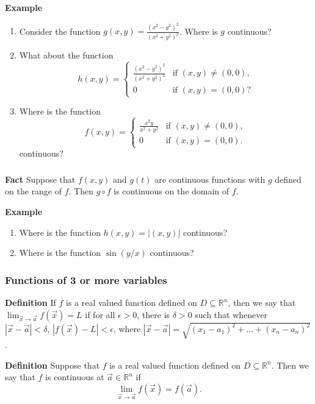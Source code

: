 \begin{frame}[fragile]\frametitle{}
 
\textbf{Example}
\begin{enumerate}
\item  Consider the function $g(x,y) = \frac{ (x^2-y^2)^2 }{(x^2+y^2)^2}$.  Where is $g$ continuous?  
\item  What about the function 
                $$h(x,y)=\begin{cases}
                                     \frac{ (x^2-y^2)^2 }{(x^2+y^2)^2} & \mbox{if $(x,y)\neq (0,0)$}, \\
                                      0  & \mbox{if $(x,y)=(0,0)$}?
                                \end{cases}
                 $$
\item  Where is the function 
                  $$f(x,y)=\begin{cases}
                                      \frac{x^2y}{x^2+y^2} & \mbox{if $(x,y)\neq (0,0)$}, \\
                                      0  & \mbox{if $(x,y)=(0,0)$}.
                                \end{cases}
                 $$
           continuous?
\end{enumerate}

\end{frame}


\begin{frame}[fragile]\frametitle{}
 
\textbf{Fact}
Suppose that $f(x,y)$ and $g(t)$ are continuous functions with $g$ defined on the range of $f$.  Then $g\circ f$ is continuous on the domain of $f$.
  

\textbf{Example}
\begin{enumerate}
\item  Where is the function $h(x,y)=|(x,y)|$ continuous?  
\item  Where is the function $\sin(y/x)$ continuous?
\end{enumerate}

\end{frame}

\begin{frame}[fragile] \frametitle{Functions of 3 or more variables}
\textbf{Definition}
If $f$ is a real valued function defined on $D\subseteq \mathbb R^n$, then we say that $\lim_{\vec{x}\rightarrow\vec{a}} f(\vec{x})=L$ if
for all $\epsilon >0$, there is $\delta > 0$ such that whenever $|\vec{x}-\vec{a}|<\delta$, $|f(\vec{x})-L|<\epsilon$, where 
$|\vec{x}-\vec{a}| =\sqrt{(x_1-a_1)^2 +\dots +(x_n-a_n)^2}$.
  

\textbf{Definition}
Suppose that $f$ is a real valued function defined on $D\subseteq \mathbb R^n$.  Then we say that $f$ is continuous at $\vec{a}\in \mathbb R^n$ if
$$
\lim_{\vec{x}\rightarrow\vec{a}} f(\vec{x}) =f(\vec{a}).
$$

\end{frame}
